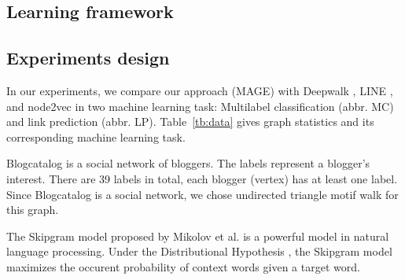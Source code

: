 \documentclass[letterpaper]{article}
\begin{document}
        \subsection{Learning framework}
            
             

        \subsection{Experiments design}
            
            In our experiments, we compare our approach (MAGE) with Deepwalk \cite{deepwalk}, 
            LINE \cite{LINE}, and node2vec \cite{node2vec} in two machine learning task: Multilabel
            classification (abbr. MC) and link prediction (abbr. LP). Table~\ref{tb:data} gives 
            graph statistics and its corresponding machine learning task. 

            \begin{table}
                \centering
                \label{tb:data}
                \caption{Datasets and machine learning task}
            \end{table}

            Blogcatalog \cite{blogcatalog} is a social network of bloggers. The labels represent
            a blogger's interest. There are 39 labels in total, each blogger (vertex) has at least
            one label. Since Blogcatalog is a social network, we chose undirected triangle motif
            walk for this graph.

            The Skipgram model proposed by Mikolov et al. \cite{skipgram} is a powerful model 
            in natural language processing. Under the Distributional Hypothesis \cite{disthyp},
            the Skipgram model maximizes the occurent probability of context words given a target
            word. 
\end{document}
